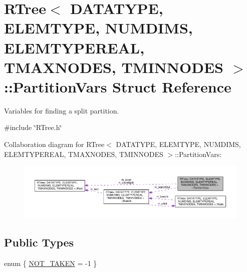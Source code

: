 \hypertarget{structRTree_1_1PartitionVars}{\section{R\-Tree$<$ D\-A\-T\-A\-T\-Y\-P\-E, E\-L\-E\-M\-T\-Y\-P\-E, N\-U\-M\-D\-I\-M\-S, E\-L\-E\-M\-T\-Y\-P\-E\-R\-E\-A\-L, T\-M\-A\-X\-N\-O\-D\-E\-S, T\-M\-I\-N\-N\-O\-D\-E\-S $>$\-:\-:Partition\-Vars Struct Reference}
\label{structRTree_1_1PartitionVars}
}


Variables for finding a split partition.  




{\ttfamily \#include \char`\"{}R\-Tree.\-h\char`\"{}}



Collaboration diagram for R\-Tree$<$ D\-A\-T\-A\-T\-Y\-P\-E, E\-L\-E\-M\-T\-Y\-P\-E, N\-U\-M\-D\-I\-M\-S, E\-L\-E\-M\-T\-Y\-P\-E\-R\-E\-A\-L, T\-M\-A\-X\-N\-O\-D\-E\-S, T\-M\-I\-N\-N\-O\-D\-E\-S $>$\-:\-:Partition\-Vars\-:\nopagebreak
\begin{figure}[H]
\begin{center}
\leavevmode
\includegraphics[width=350pt]{structRTree_1_1PartitionVars__coll__graph}
\end{center}
\end{figure}
\subsection*{Public Types}
\begin{DoxyCompactItemize}
\item 
enum \{ \hyperlink{structRTree_1_1PartitionVars_aa4395bc76d345f0a081c164bf68d4744acff1a730449e4b3de500024b4b6b6175}{N\-O\-T\-\_\-\-T\-A\-K\-E\-N} = -\/1
 \}
\end{DoxyCompactItemize}
